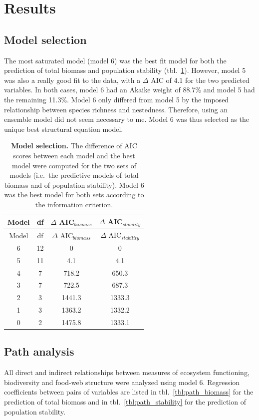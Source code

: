 \documentclass[10pt,oneside]{article}
\begin{document}
\hypertarget{results}{%
\section{Results}\label{results}}

\hypertarget{model-selection}{%
\subsection{Model selection}\label{model-selection}}

The most saturated model (model 6) was the best fit model for both the
prediction of total biomass and population stability
(tbl.~\ref{tbl:AIC}). However, model 5 was also a really good fit to the
data, with a \(\Delta\) AIC of 4.1 for the two predicted variables. In
both cases, model 6 had an Akaike weight of 88.7\% and model 5 had the
remaining 11.3\%. Model 6 only differed from model 5 by the imposed
relationship between species richness and nestedness. Therefore, using
an ensemble model did not seem necessary to me. Model 6 was thus
selected as the unique best structural equation model.

\hypertarget{tbl:AIC}{}
\begin{longtable}[]{@{}cccc@{}}
\caption{\label{tbl:AIC}\textbf{Model selection.} The difference of AIC
scores between each model and the best model were computed for the two
sets of models (i.e.~the predictive models of total biomass and of
population stability). Model 6 was the best model for both sets
according to the information criterion.}\tabularnewline
\toprule
Model & df & \(\Delta\) AIC\(_{biomass}\) & \(\Delta\)
AIC\(_{stability}\)\tabularnewline
\midrule
\endfirsthead
\toprule
Model & df & \(\Delta\) AIC\(_{biomass}\) & \(\Delta\)
AIC\(_{stability}\)\tabularnewline
\midrule
\endhead
6 & 12 & 0 & 0\tabularnewline
5 & 11 & 4.1 & 4.1\tabularnewline
4 & 7 & 718.2 & 650.3\tabularnewline
3 & 7 & 722.5 & 687.3\tabularnewline
2 & 3 & 1441.3 & 1333.3\tabularnewline
1 & 3 & 1363.2 & 1332.2\tabularnewline
0 & 2 & 1475.8 & 1333.1\tabularnewline
\bottomrule
\end{longtable}

\hypertarget{path-analysis}{%
\subsection{Path analysis}\label{path-analysis}}

All direct and indirect relationships between measures of ecosystem
functioning, biodiversity and food-web structure were analyzed using
model 6. Regression coefficients between pairs of variables are listed
in tbl.~\ref{tbl:path_biomass} for the prediction of total biomass and
in tbl.~\ref{tbl:path_stability} for the prediction of population
stability.
\end{document}

